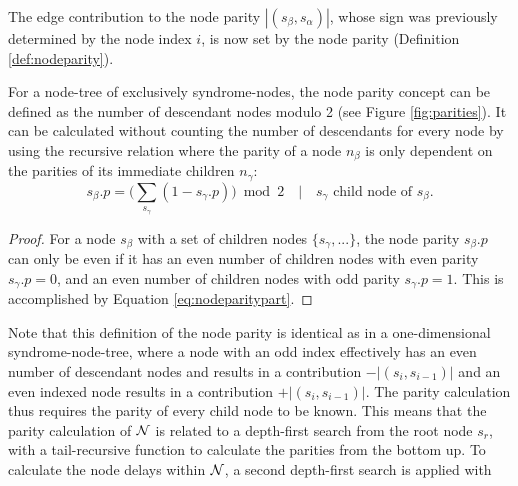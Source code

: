 The edge contribution to the node parity $|(s_\beta, s_\alpha)|$, whose sign was previously determined by the node index $i$, is now set by the node parity (Definition \ref{def:nodeparity}). 
\begin{lemma}\label{lem:nodeparitypart}
  For a node-tree of exclusively syndrome-nodes, the node parity concept can be defined as the number of descendant nodes modulo 2 (see Figure \ref{fig:parities}). It can be calculated without counting the number of descendants for every node by using the recursive relation where the parity of a node $n_\beta$ is only dependent on the parities of its immediate children $n_\gamma$:
  \begin{equation}\label{eq:nodeparitypart}
    s_\beta.p = \big( \sum_{s_\gamma} (1-s_\gamma.p) \big ) \bmod 2 \hspace{1em} | \hspace{1em} s_\gamma \text{ child node of } s_\beta.
  \end{equation}
\end{lemma}
\begin{proof}
  For a node $s_\beta$ with a set of children nodes $\{s_\gamma, ...\}$, the node parity $s_\beta.p$ can only be even if it has an even number of children nodes with even parity $s_\gamma.p = 0$, and an even number of children nodes with odd parity $s_\gamma.p=1$. This is accomplished by Equation \ref{eq:nodeparitypart}. 
\end{proof}
Note that this definition of the node parity is identical as in a one-dimensional syndrome-node-tree, where a node with an odd index effectively has an even number of descendant nodes and results in a contribution $-|(s_i, s_{i-1})|$ and an even indexed node results in a contribution $+|(s_i, s_{i-1})|$. The parity calculation thus requires the parity of every child node to be known. This means that the parity calculation of $\mathcal{N}$ is related to a depth-first search from the root node $s_r$, with a tail-recursive function to calculate the parities from the bottom up. To calculate the node delays within $\mathcal{N}$, a second depth-first search is applied with
